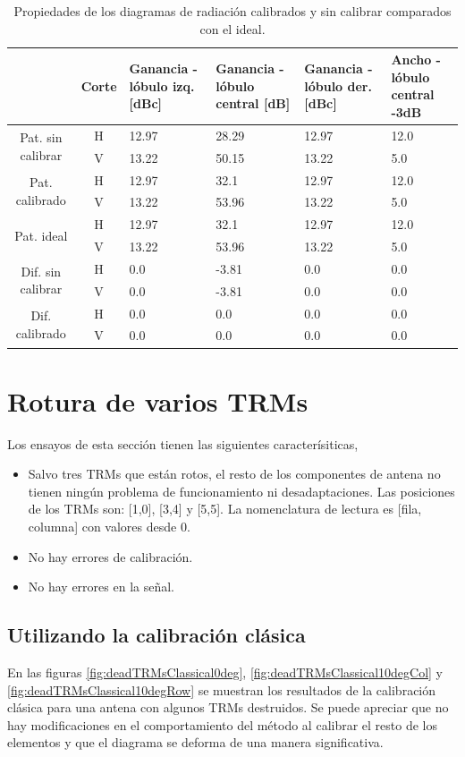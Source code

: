 \begin{table}[H]
  \footnotesize
  \centering
  \begin{tabular}{|c|c|p{2cm}|p{2.5cm}|p{2.5cm}|p{2.5cm}|}
    \cline{2-6}
    \multicolumn{1}{c|}{} & Corte & Ganancia - lóbulo izq. [dBc] & Ganancia - lóbulo central [dB] &
    Ganancia - lóbulo der. [dBc] & Ancho - lóbulo central -3dB \tabularnewline\hline
    \multirow{2}{2cm}{Pat. sin calibrar} & H & 12.97 & 28.29 & 12.97 & 12.0 \tabularnewline\cline{2-6}
     & V & 13.22 & 50.15 & 13.22 & 5.0 \tabularnewline\hline
    \multirow{2}{2cm}{Pat. calibrado} & H & 12.97 & 32.1 & 12.97 & 12.0 \tabularnewline\cline{2-6}
     & V & 13.22 & 53.96 & 13.22 & 5.0 \tabularnewline\hline
    \multirow{2}{2cm}{Pat. ideal} & H & 12.97 & 32.1 & 12.97 & 12.0 \tabularnewline\cline{2-6}
     & V & 13.22 & 53.96 & 13.22 & 5.0 \tabularnewline\hline
    \multirow{2}{2cm}{Dif. sin calibrar} & H & 0.0 & -3.81 & 0.0 & 0.0\tabularnewline\cline{2-6}
     & V & 0.0 & -3.81 & 0.0 & 0.0 \tabularnewline\hline
    \multirow{2}{2cm}{Dif. calibrado} & H & 0.0 & 0.0 & 0.0 & 0.0 \tabularnewline\cline{2-6}
     & V & 0.0 & 0.0 & 0.0 & 0.0 \tabularnewline\hline
  \end{tabular}
  \caption{Propiedades de los diagramas de radiación calibrados y sin calibrar comparados con el ideal.}
  \label{tab:nonErrMutual10degRow}
\end{table}


\section{Rotura de varios TRMs}
Los ensayos de esta sección tienen las siguientes caracterísiticas,
\begin{itemize}
	\item Salvo tres TRMs que están rotos, el resto de los componentes de antena no tienen ningún problema de funcionamiento ni 
		desadaptaciones. Las posiciones de los TRMs son: [1,0], [3,4] y [5,5]. La nomenclatura de lectura es [fila, columna] con 
		valores desde 0.
	\item No hay errores de calibración.
	\item No hay errores en la señal.
\end{itemize}

\subsection{Utilizando la calibración clásica}
En las figuras \ref{fig:deadTRMsClassical0deg}, \ref{fig:deadTRMsClassical10degCol} y \ref{fig:deadTRMsClassical10degRow} se 
muestran los resultados de la calibración clásica para una antena con algunos TRMs destruidos. Se puede apreciar que no hay 
modificaciones en el comportamiento del método al calibrar el resto de los elementos y que el diagrama se deforma de una manera 
significativa.

